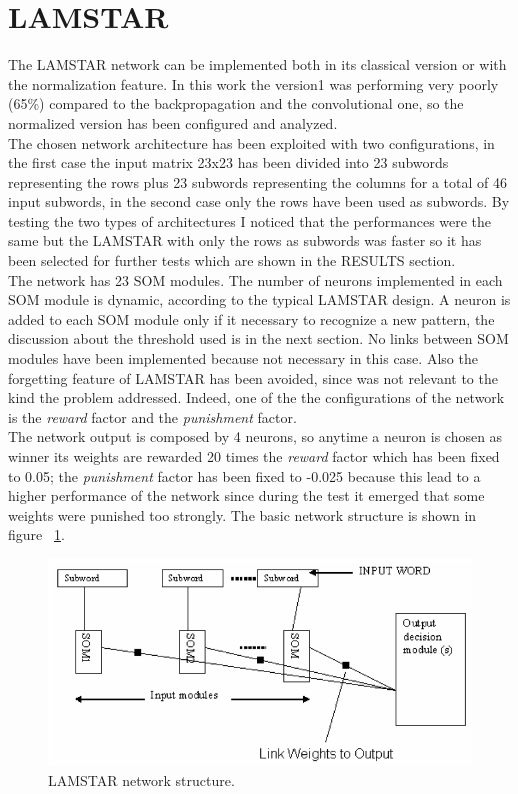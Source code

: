 \documentclass[a4paper, 10pt, conference]{ieeeconf}      %
\begin{document}
\section{LAMSTAR}\label{sec:lamstar}
The LAMSTAR network can be implemented both in its classical version or with the normalization feature. In this work the version1 was performing very poorly (65\%) compared to the backpropagation and the convolutional one, so the normalized version has been configured and analyzed.\\
The chosen network architecture has been exploited with two configurations, in the first case the input matrix 23x23 has been divided into 23 subwords representing the rows plus 23 subwords representing the columns for a total of 46 input subwords, in the second case only the rows have been used as subwords. By testing the two types of architectures I noticed that the performances were the same but the LAMSTAR with only the rows as subwords was faster so it has been selected for further tests which are shown in the RESULTS section.\\
The network has 23 SOM modules.
The number of neurons implemented in each
SOM module is dynamic, according to the typical
LAMSTAR design. A neuron is added to each
SOM module only if it necessary to recognize a
new pattern, the discussion about the threshold used is in the next section.
No links between SOM modules have been implemented because not necessary in this case. Also the forgetting feature of LAMSTAR
has been avoided, since was not relevant
to the kind the problem addressed.
Indeed, one of the the configurations of the network is the \textit{reward} factor and the \textit{punishment} factor.\\
The network output is composed by 4 neurons, so anytime a neuron is chosen as winner its weights are rewarded 20 times the \textit{reward} factor which has been fixed to 0.05; the \textit{punishment} factor has been fixed to -0.025 because this lead to a higher performance of the network since during the test it emerged that some weights were punished too strongly.
The basic network structure is shown in figure ~\ref{lamstar}.
\begin{figure}[thpb]
	\centering
	\includegraphics[scale=0.45]{lamstar.png}
	\caption{LAMSTAR network structure.}
	\label{lamstar}
\end{figure}
\end{document}
